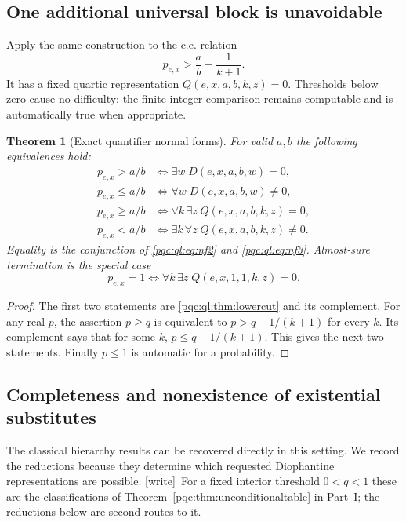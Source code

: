 \documentclass[11pt,letterpaper]{article}
\numberwithin{equation}{section}
\newtheorem{theorem}{Theorem}[section]
\theoremstyle{definition}
\theoremstyle{remark}
\newcommand{\wtag}{\textup{[write]}}
\begin{document}
\subsection{One additional universal block is unavoidable}
Apply the same construction to the c.e. relation
\[
 p_{e,x}>\frac ab-\frac1{k+1}.
\]
It has a fixed quartic representation $Q(e,x,a,b,k,z)=0$. Thresholds below
zero cause no difficulty: the finite integer comparison remains
computable and is automatically true when appropriate.

\begin{theorem}[Exact quantifier normal forms]\label{pqc:ql:thm:quantifiers}
For valid $a,b$ the following equivalences hold:
\begin{align}
 p_{e,x}>a/b &\iff\exists w\;D(e,x,a,b,w)=0,\label{pqc:ql:eq:nf1}\\
 p_{e,x}\le a/b &\iff\forall w\;D(e,x,a,b,w)\ne0,\label{pqc:ql:eq:nf2}\\
 p_{e,x}\ge a/b &\iff\forall k\,\exists z\;Q(e,x,a,b,k,z)=0,\label{pqc:ql:eq:nf3}\\
 p_{e,x}<a/b &\iff\exists k\,\forall z\;Q(e,x,a,b,k,z)\ne0.\label{pqc:ql:eq:nf4}
\end{align}
Equality is the conjunction of \eqref{pqc:ql:eq:nf2} and \eqref{pqc:ql:eq:nf3}.
Almost-sure termination is the special case
\begin{equation}\label{pqc:ql:eq:ASTquartic}
 p_{e,x}=1\iff\forall k\,\exists z\;Q(e,x,1,1,k,z)=0.
\end{equation}
\end{theorem}
\begin{proof}
The first two statements are \cref{pqc:ql:thm:lowercut} and its complement.
For any real $p$, the assertion $p\ge q$ is equivalent to
$p>q-1/(k+1)$ for every $k$. Its complement says that for some $k$,
$p\le q-1/(k+1)$. This gives the next two statements. Finally $p\le1$
is automatic for a probability.
\end{proof}

\subsection{Completeness and nonexistence of existential substitutes}
The classical hierarchy results \cite{kaminski-katoen} can be recovered directly in
this setting. We record the reductions because they determine which
requested Diophantine representations are possible. \wtag\ For a fixed interior threshold $0<q<1$ these are the classifications of Theorem~\ref{pqc:thm:unconditionaltable} in Part~I; the reductions below are second routes to it.
\end{document}
